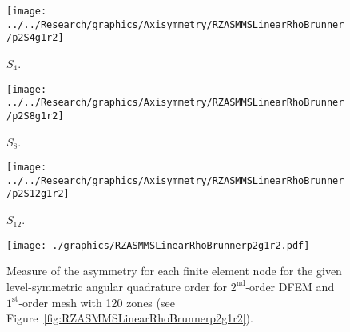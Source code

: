 \documentclass[12pt,letterpaper]{article}
\begin{document}
\begin{sidewaysfigure}[!htb]
\centering
\begin{subfigure}{0.33\textwidth}
\texttt{[image: ../../Research/graphics/Axisymmetry/RZASMMSLinearRhoBrunner/p2S4g1r2]}
\caption{$S_4$.}
\end{subfigure}%
\begin{subfigure}{0.33\textwidth}
\texttt{[image: ../../Research/graphics/Axisymmetry/RZASMMSLinearRhoBrunner/p2S8g1r2]}
\caption{$S_8$.}
\end{subfigure}%
\begin{subfigure}{0.33\textwidth}
\texttt{[image: ../../Research/graphics/Axisymmetry/RZASMMSLinearRhoBrunner/p2S12g1r2]}
\caption{$S_{12}$.}
\end{subfigure}
\caption{Relative asymmetry for $2^\text{st}$-order finite elements on a $1^\text{st}$-order mesh for given order of level-symmetric angular quadrature.}
\label{fig:RZASMMSLinearRhoBrunnerp2g1r2}
\end{sidewaysfigure}

\begin{figure}[!htb]
\centering
\texttt{[image: ./graphics/RZASMMSLinearRhoBrunnerp2g1r2.pdf]}
\caption{Measure of the asymmetry for each finite element node for the given level-symmetric angular quadrature order for $2^\text{nd}$-order DFEM and $1^\text{st}$-order mesh with 120 zones (see Figure~\ref{fig:RZASMMSLinearRhoBrunnerp2g1r2}).}
\label{fig:RZASMMSLinearRhoBrunnerp2g1r2Nodes}
\end{figure}
\end{document}
